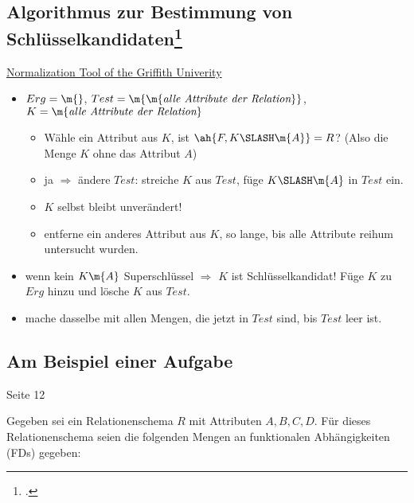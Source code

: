 \documentclass{lehramt-informatik-haupt}
\begin{document}
%

\subsection{Algorithmus zur Bestimmung von Schlüsselkandidaten\footcite[Seite 8]{db:fs:4}}

\href{http://www.ict.griffith.edu.au/normalization_tools/normalization/ind.php}
{Normalization Tool of the Griffith Univerity}

\begin{itemize}
\item
$Erg = \m{}$,
$Test = \m{\m{\textit{alle Attribute der Relation}}}$,
$K = \m{\textit{alle Attribute der Relation}}$

\begin{itemize}
\item Wähle ein Attribut aus $K$, ist
$\ah{F,K \SLASH \m{A}} = R$?
(Also die Menge $K$ ohne das Attribut $A$)

\item ja $\Rightarrow$ ändere $\textit{Test}$:
streiche $K$ aus $\textit{Test}$, füge $K \SLASH \m{A}$ in $\textit{Test}$ ein.

\item $K$ selbst bleibt unverändert!

\item entferne ein anderes Attribut aus $K$, so lange, bis alle
Attribute reihum untersucht wurden.
\end{itemize}

\item wenn kein $K\m{A}$ Superschlüssel $\Rightarrow$
$K$ ist Schlüsselkandidat!
Füge $K$ zu $Erg$ hinzu und lösche $K$ aus $\textit{Test}$.

\item mache dasselbe mit allen Mengen, die jetzt in $\textit{Test}$ sind,
bis $\textit{Test}$ leer ist.

\end{itemize}

\subsection{Am Beispiel einer Aufgabe}

Seite 12

Gegeben sei ein Relationenschema $R$ mit Attributen $A, B, C, D$. Für
dieses Relationenschema seien die folgenden Mengen an funktionalen
Abhängigkeiten (FDs) gegeben:
\end{document}
